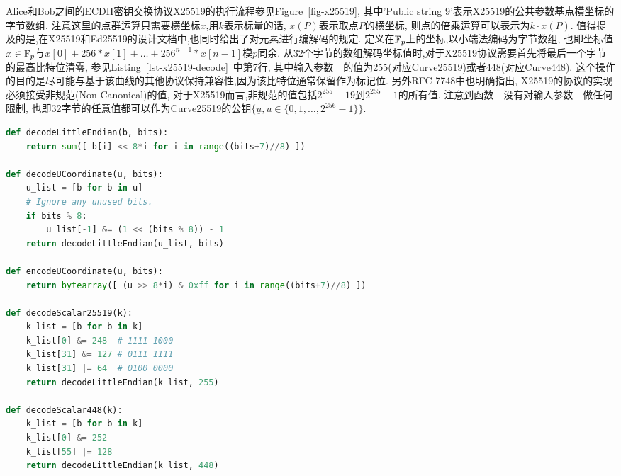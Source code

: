 Alice和Bob之间的ECDH密钥交换协议X25519的执行流程参见Figure~\ref{fig-x25519},
其中'Public string \underline{9}'表示X25519的公共参数基点横坐标的字节数组.
注意这里的点群运算只需要横坐标$x$,用$k$表示标量的话, $x(P)$表示取点$P$的横坐标,
则点的倍乘运算可以表示为$k\cdot x(P)$.
值得提及的是,在X25519和Ed25519的设计文档中,也同时给出了对元素进行编解码的规定.
定义在$\mathbb{F}_p$上的坐标,以小端法编码为字节数组,
也即坐标值$x\in\mathbb{F}_p$与$x[0] + 256  *x[1] + \ldots + 256^{n-1} * x[n-1]$模$p$同余.
从32个字节的数组解码坐标值时,对于X25519协议需要首先将最后一个字节的最高比特位清零,
参见Listing~\ref{lst-x25519-decode}~中第7行,
其中输入参数~~的值为255(对应Curve25519)或者448(对应Curve448).
这个操作的目的是尽可能与基于该曲线的其他协议保持兼容性,因为该比特位通常保留作为标记位.
另外RFC 7748中也明确指出, X25519的协议的实现必须接受非规范(Non-Canonical)的值,
对于X25519而言,非规范的值包括$2^{255}-19$到$2^{255}-1$的所有值.
注意到函数~~没有对输入参数~~做任何限制,
也即32字节的任意值都可以作为Curve25519的公钥$\{\underline{u}, u\in \{0,1,\ldots,2^{256}-1\}\}$.

\begin{lstlisting}[language=python, caption=X25519和X448的编解码, label=lst-x25519-decode]
def decodeLittleEndian(b, bits):
    return sum([ b[i] << 8*i for i in range((bits+7)//8) ])

def decodeUCoordinate(u, bits):
    u_list = [b for b in u]
    # Ignore any unused bits.
    if bits % 8:
        u_list[-1] &= (1 << (bits % 8)) - 1
    return decodeLittleEndian(u_list, bits)

def encodeUCoordinate(u, bits):
    return bytearray([ (u >> 8*i) & 0xff for i in range((bits+7)//8) ])

def decodeScalar25519(k):
    k_list = [b for b in k]
    k_list[0] &= 248  # 1111 1000
    k_list[31] &= 127 # 0111 1111
    k_list[31] |= 64  # 0100 0000
    return decodeLittleEndian(k_list, 255)

def decodeScalar448(k):
    k_list = [b for b in k]
    k_list[0] &= 252
    k_list[55] |= 128
    return decodeLittleEndian(k_list, 448)
\end{lstlisting}

